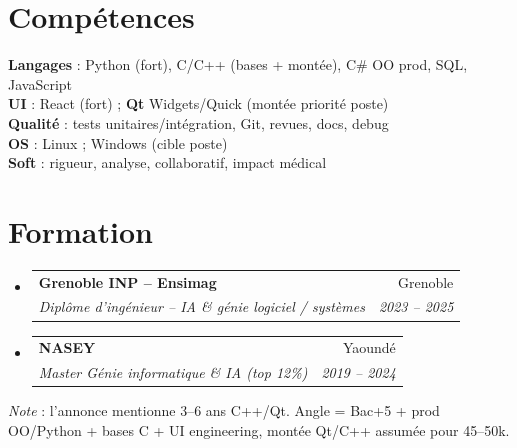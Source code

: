 \documentclass[a4paper,10.5pt]{article}
\makeatletter
\newcommand{\resumeSubheading}[4]{\vspace{2.5pt}\item\begin{tabular*}{0.97\textwidth}[t]{l@{\extracolsep{\fill}}r}\textbf{#1}&{#2}\\\textit{\small #3}&\textit{\small #4}\\\end{tabular*}\vspace{1pt}}
\newcommand{\resumeSubHeadingListStart}{\begin{itemize}[leftmargin=0.08in,label={}]}
\newcommand{\resumeSubHeadingListEnd}{\end{itemize}}
\makeatother
\begin{document}
\section{Comp\'etences}
\begin{itemize}[leftmargin=0.08in,label={}]\small{\item{
\textbf{Langages} : Python (fort), C/C++ (bases + mont\'ee), C\# OO prod, SQL, JavaScript \\
\textbf{UI} : React (fort) ; \textbf{Qt} Widgets/Quick (mont\'ee priorit\'e poste) \\
\textbf{Qualit\'e} : tests unitaires/int\'egration, Git, revues, docs, debug \\
\textbf{OS} : Linux ; Windows (cible poste) \\
\textbf{Soft} : rigueur, analyse, collaboratif, impact m\'edical
}}\end{itemize}

\section{Formation}
\resumeSubHeadingListStart
  \resumeSubheading{Grenoble INP -- Ensimag}{Grenoble}{Dipl\^ome d'ing\'enieur -- IA \& g\'enie logiciel / syst\`emes}{2023 -- 2025}
  \resumeSubheading{NASEY}{Yaound\'e}{Master G\'enie informatique \& IA (top 12\%)}{2019 -- 2024}
\resumeSubHeadingListEnd

\vspace{3pt}
\small{\textit{Note} : l'annonce mentionne 3--6 ans C++/Qt. Angle = Bac+5 + prod OO/Python + bases C + UI engineering, mont\'ee Qt/C++ assum\'ee pour 45--50k.}
\end{document}
